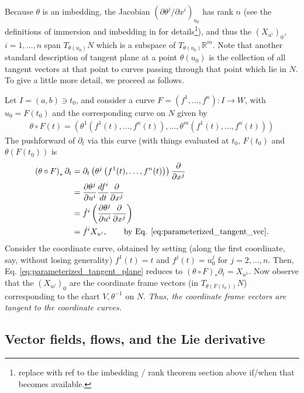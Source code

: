 \documentclass[psamsfonts]{amsart}
\theoremstyle{definition}
\theoremstyle{remark}
\newcommand*\R{\mathds{R}}
\numberwithin{equation}{section}
\begin{document}
Because $\theta$ is an imbedding, the Jacobian $\left(\partial \theta^j / \partial x^i\right)_{u_0}$ has rank $n$ (see the definitions of immersion and imbedding in \cite{boothby_2002} for details\footnote{{\color{red}replace with ref to the imbedding / rank theorem section above if/when that becomes available.}}), and thus the $ \left(X_{u^i}\right)_0$, $i=1,\dots, n$ span $T_{\theta(u_0)}N$ which is a subspace of $T_{\theta(u_0)}\R^m$. Note that another standard description of tangent plane at a point $\theta(u_0)$ is the collection of all tangent vectors at that point to curves passing through that point which lie in $N$. To give a little more detail, we proceed as follows. 

Let $I = (a, b) \ni t_0$, and consider a curve $F = \left(f^1, \dots, f^n\right) : I \rightarrow W$, with $u_0 = F(t_0)$ and the corresponding curve on $N$ given by 
\begin{align}
\theta \circ F(t) = \left(\theta^1(f^1(t), \dots, f^n(t)), \dots, \theta^m(f^1(t), \dots, f^n(t))\right)
\end{align}
The pushforward of $\partial_{t}$ via this curve (with things evaluated at $t_0$, $F(t_0)$ and $\theta(F(t_0))$ is
\begin{equation}\begin{aligned}\label{eq:parameterized_tangent_plane}
\left(\theta\circ F\right)_* \partial_{t} &={} \partial_{t}\left(\theta^j\left(f^1(t), \dots, f^n(t)\right)\right)\frac{\partial}{\partial x^j}\\
&={} \frac{\partial \theta^j}{\partial u^i}\frac{d f^i}{dt}\frac{\partial}{\partial x^j}\\
&={} \dot f^i \left(\frac{\partial \theta^j}{\partial u^i}\frac{\partial}{\partial x^j}\right)\\
&={} \dot f^i X_{u^i}, \qquad \text{by Eq. \ref{eq:parameterized_tangent_vec}.}
\end{aligned}\end{equation}
Consider the coordinate curve, obtained by setting (along the first coordinate, say, without losing generality) $f^1(t) = t$ and $f^j(t) = u^j_0$ for $j = 2, \dots, n$. Then, Eq. \ref{eq:parameterized_tangent_plane} reduces to $\left(\theta\circ F\right)_* \partial_{t} = X_{u^1}$. Now observe that the $(X_{u^j})_0$ are the coordinate frame vectors (in $T_{\theta(F(t_0))}N$) corresponding to the chart $V, \theta^{-1}$ on $N$. \textit{Thus, the coordinate frame vectors are tangent to the coordinate curves.}

\subsection{Vector fields, flows, and the Lie derivative}
\end{document}
